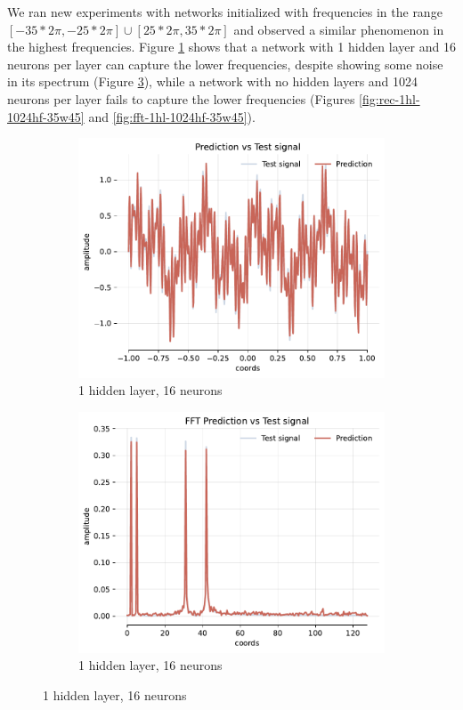 We ran new experiments with networks initialized with frequencies in the range $[-35*2\pi, -25*2\pi] \cup [25*2\pi, 35*2\pi]$ and observed a similar phenomenon in the highest frequencies. Figure \ref{fig:rec-1hl-16hf-35w45} shows that a network with 1 hidden layer and 16 neurons per layer can capture the lower frequencies, despite showing some noise in its spectrum (Figure \ref{fig:fft-1hl-16hf-35w45}), while a network with no hidden layers and 1024 neurons per layer fails to capture the lower frequencies (Figures \ref{fig:rec-1hl-1024hf-35w45} and \ref{fig:fft-1hl-1024hf-35w45}).

\begin{figure}
    \centering
    \begin{subfigure}[b]{0.40\textwidth}
        \centering
        \includegraphics[width=\textwidth]{img/ch4/prediction_1hl_16hf_35w45.pdf}
        \caption{1 hidden layer, 16 neurons}
        \label{fig:rec-1hl-16hf-35w45}
    \end{subfigure}
    \begin{subfigure}[b]{0.40\textwidth}
        \centering
        \includegraphics[width=\textwidth]{img/ch4/fft_1hl_16hf_35w45.pdf}
        \caption{1 hidden layer, 16 neurons}
        \label{fig:fft-1hl-16hf-35w45}
    \end{subfigure}
    

\end{figure}
